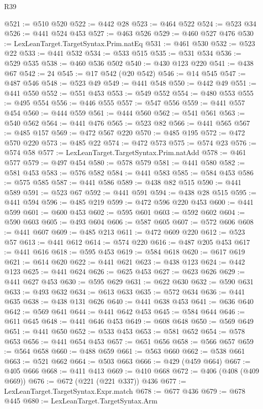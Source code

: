 \begin{lexlean}{R39}
\begin{coremodule}
@521 := @510 @520
@522 := @442 @28
@523 := @464 @522
@524 := @523 @34
@526 := @441 @524 @453
@527 := @463 @526
@529 := @460 @527 @476
@530 := LexLeanTarget.TargetSyntax.Prim.natEq
@531 := @461 @530
@532 := @523 @22
@533 := @441 @532
@534 := @533 @515
@535 := @531 @534
@536 := @529 @535
@538 := @460 @536 @502
@540 := @430 @123 @220
@541 := @438 @67
@542 := 24
@545 := @17 @542 (@20 @542)
@546 := @14 @545
@547 := @487 @546
@548 := @523 @49
@549 := @441 @548
@550 := @442 @49
@551 := @441 @550
@552 := @551 @453
@553 := @549 @552
@554 := @480 @553
@555 := @495 @554
@556 := @446 @555
@557 := @547 @556
@559 := @441 @557 @454
@560 := @444 @559
@561 := @444 @560
@562 := @541 @561
@563 := @540 @562
@564 := @441 @476
@565 := @523 @82
@566 := @441 @565
@567 := @485 @157
@569 := @472 @567 @220
@570 := @485 @195
@572 := @472 @570 @220
@573 := @485 @22
@574 := @472 @573
@575 := @574 @23
@576 := @574 @58
@577 := LexLeanTarget.TargetSyntax.Prim.natAdd
@578 := @461 @577
@579 := @497 @454
@580 := @578 @579
@581 := @441 @580
@582 := @581 @453
@583 := @576 @582
@584 := @441 @583
@585 := @584 @453
@586 := @575 @585
@587 := @441 @586
@589 := @438 @82 @515
@590 := @441 @589
@591 := @523 @67
@592 := @441 @591
@594 := @438 @28 @515
@595 := @441 @594
@596 := @485 @219
@599 := @472 @596 @220 @453
@600 := @441 @599
@601 := @600 @453
@602 := @595 @601
@603 := @592 @602
@604 := @590 @603
@605 := @493 @604
@606 := @587 @605
@607 := @572 @606
@608 := @441 @607
@609 := @485 @213
@611 := @472 @609 @220
@612 := @523 @57
@613 := @441 @612
@614 := @574 @220
@616 := @487 @205 @453
@617 := @441 @616
@618 := @595 @453
@619 := @584 @618
@620 := @617 @619
@621 := @614 @620
@622 := @441 @621
@623 := @438 @123
@624 := @442 @123
@625 := @441 @624
@626 := @625 @453
@627 := @623 @626
@629 := @441 @627 @453
@630 := @595 @629
@631 := @622 @630
@632 := @590 @631
@633 := @493 @632
@634 := @613 @633
@635 := @572 @634
@636 := @441 @635
@638 := @438 @131 @626
@640 := @441 @638 @453
@641 := @636 @640
@642 := @569 @641
@644 := @441 @642 @453
@645 := @584 @644
@646 := @611 @645
@648 := @441 @646 @453
@649 := @608 @648
@650 := @569 @649
@651 := @441 @650
@652 := @533 @453
@653 := @581 @652
@654 := @578 @653
@656 := @441 @654 @453
@657 := @651 @656
@658 := @566 @657
@659 := @564 @658
@660 := @488 @659
@661 := @563 @660
@662 := @538 @661
@663 := @521 @662
@664 := @503 @663
@666 := @429 (@459 @664)
@667 := @405 @666
@668 := @411 @413
@669 := @410 @668
@672 := @406 (@408 (@409 @669))
@676 := @672 (@221 (@221 @337)) @436
@677 := LexLeanTarget.TargetSyntax.Expr.match
@678 := @677 @436
@679 := @678 @445
@680 := LexLeanTarget.TargetSyntax.Arm

\end{coremodule}
\end{lexlean}
